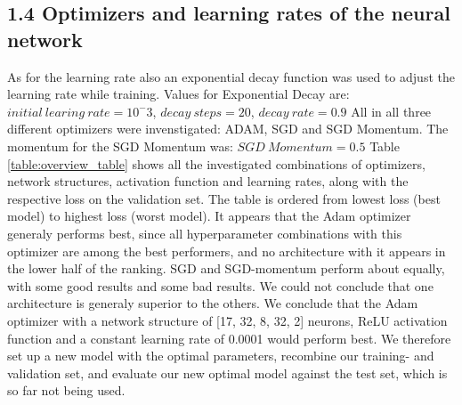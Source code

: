 \subsection*{1.4 Optimizers and learning rates of the neural network}
As for the learning rate also an exponential decay function was used to adjust the learning rate while training.
Values for Exponential Decay are: 
$initial\ learing\ rate =  10^-3$, 
$decay\ steps=20$, 
$decay\ rate=0.9$
All in all three different optimizers were invenstigated: ADAM, SGD and SGD Momentum. The momentum for the SGD Momentum was:
$SGD\ Momentum= 0.5$
Table \ref{table:overview_table} shows all the investigated combinations of optimizers, network structures, activation function and learning rates, along with the respective loss on the validation set. The table is ordered from lowest loss (best model) to highest loss (worst model). It appears that the Adam optimizer generaly performs best, since all hyperparameter combinations with this optimizer are among the best performers, and no architecture with it appears in the lower half of the ranking. SGD and SGD-momentum perform about equally, with some good results and some bad results. We could not conclude that one architecture is generaly superior to the others.
We conclude that the Adam optimizer with a network structure of [17, 32, 8, 32, 2] neurons, ReLU activation function and a constant learning rate of 0.0001 would perform best.
We therefore set up a new model with the optimal parameters, recombine our training- and validation set, and evaluate our new optimal model against the test set, which is so far not being used.
